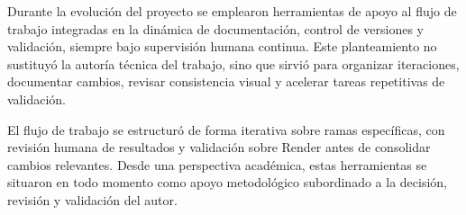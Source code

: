Durante la evolución del proyecto se emplearon herramientas de apoyo al flujo de trabajo integradas en la dinámica de documentación, control de versiones y validación, siempre bajo supervisión humana continua. Este planteamiento no sustituyó la autoría técnica del trabajo, sino que sirvió para organizar iteraciones, documentar cambios, revisar consistencia visual y acelerar tareas repetitivas de validación.

El flujo de trabajo se estructuró de forma iterativa sobre ramas específicas, con revisión humana de resultados y validación sobre Render antes de consolidar cambios relevantes. Desde una perspectiva académica, estas herramientas se situaron en todo momento como apoyo metodológico subordinado a la decisión, revisión y validación del autor.
